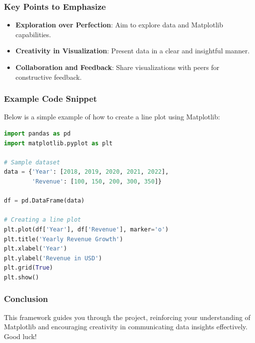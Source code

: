\documentclass{beamer}
\begin{document}
\begin{frame}
    \frametitle{Key Points to Emphasize}
    \begin{itemize}
        \item \textbf{Exploration over Perfection}: Aim to explore data and Matplotlib capabilities.
        \item \textbf{Creativity in Visualization}: Present data in a clear and insightful manner.
        \item \textbf{Collaboration and Feedback}: Share visualizations with peers for constructive feedback.
    \end{itemize}
\end{frame}

\begin{frame}[fragile]
    \frametitle{Example Code Snippet}
    Below is a simple example of how to create a line plot using Matplotlib:
    \begin{lstlisting}[language=Python]
import pandas as pd
import matplotlib.pyplot as plt

# Sample dataset
data = {'Year': [2018, 2019, 2020, 2021, 2022],
        'Revenue': [100, 150, 200, 300, 350]}

df = pd.DataFrame(data)

# Creating a line plot
plt.plot(df['Year'], df['Revenue'], marker='o')
plt.title('Yearly Revenue Growth')
plt.xlabel('Year')
plt.ylabel('Revenue in USD')
plt.grid(True)
plt.show()
    \end{lstlisting}
\end{frame}

\begin{frame}
    \frametitle{Conclusion}
    This framework guides you through the project, reinforcing your understanding of Matplotlib and encouraging creativity in communicating data insights effectively. Good luck!
\end{frame}
\end{document}
